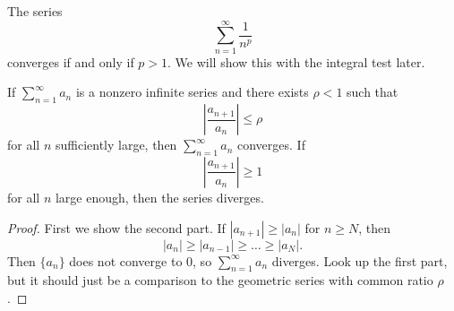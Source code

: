 \begin{example}[$p$-series]
  The series
  \[
    \sum_{n = 1}^\infty \frac{1}{n^p}
  \]
  converges if and only if $p > 1$. We will show this
  with the integral test later.
\end{example}

\begin{prop}
  If $\sum_{n = 1}^\infty a_n$ is a nonzero infinite
  series and
  there exists $\rho < 1$ such that
  \[
    \left| \frac{a_{n + 1}}{a_n} \right| \le \rho
  \]
  for all $n$ sufficiently large, then
  $\sum_{n = 1}^\infty a_n$ converges. If
  \[
    \left| \frac{a_{n + 1}}{a_n} \right| \ge 1
  \]
  for all $n$ large enough, then the series diverges.
\end{prop}

\begin{proof}
  First we show the second part. If
  $|a_{n + 1}| \ge |a_n|$ for $n \ge N$, then
  \[|a_n| \ge |a_{n - 1}| \ge \dots \ge |a_N|.\]
  Then $\{a_n\}$ does not converge to $0$, so
  $\sum_{n = 1}^\infty a_n$ diverges.
  Look up the first part, but it should just be a
  comparison to the geometric series with common ratio
  $\rho$.
\end{proof}

